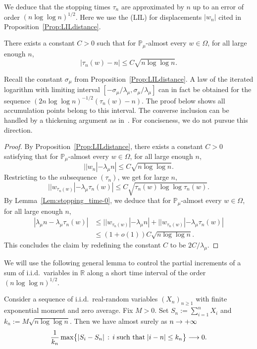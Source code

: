 \documentclass[AHL,Unicode,longabstracts,published]{cedram}
\newcommand{\R}{\mathbb{R}}
\renewcommand{\Pr}{\mathbb{P}}
\renewcommand{\(}{\left(}
\renewcommand{\)}{\right)}
\renewcommand*{\to}{\mathchoice{\longrightarrow}{\rightarrow}{\rightarrow}{\rightarrow}}
\begin{document}
We deduce that the stopping times $\tau_{n}$ are approximated by $n$ up to an error of order $(n\log\log n)^{1/2}$. Here we use the (LIL) for displacements $|w_{n}|$ cited in Proposition~\ref{Prop:LILdistance}.



\begin{lemm}\label{Lem:stopping_time}

There exists a constant $C> 0$ such that for $\Pr_{\mu}$-almost every $w\in \Omega$, for all large enough $n$,
\[
|\tau_n(w)-n|\le C\sqrt{n \log \log n}.
\]
\end{lemm}

\begin{rema}
Recall the constant $\sigma_{\mu}$ from Proposition~\ref{Prop:LILdistance}. A law of the iterated logarithm with limiting interval $[-\sigma_{\mu}/\lambda_{\mu}, \sigma_{\mu}/\lambda_{\mu}]$ can in fact be obtained for the sequence $(2n \log \log n)^{-1/2}(\tau_n(w)-n)$. The proof below shows all accumulation points belong to this interval. The converse inclusion can be handled by a thickening argument as in~\cite[Section~4.4]{BenardWinding}. For conciseness, we do not pursue this direction.
\end{rema}

\begin{proof}
By Proposition~\ref{Prop:LILdistance}, there exists a constant $C> 0$ satisfying that for $\Pr_{\mu}$-almost every $w\in \Omega$, for all large enough $n$,
\[
||w_n|-\lambda_\mu n| \le C\sqrt{n \log \log n}.
\]
Restricting to the subsequence $(\tau_{n})$, we get for large $n$,
\[
||w_{\tau_n(w)}|-\lambda_\mu \tau_n(w)|\le C\sqrt{\tau_n(w) \log \log \tau_n(w)}.
\]
By Lemma~\ref{Lem:stopping_time-0}, we deduce that for $\Pr_{\mu}$-almost every $w\in \Omega$, for all large enough $n$,
\begin{align*}
|\lambda_\mu n-\lambda_\mu \tau_n(w)| &\le ||w_{\tau_n(w)}|-\lambda_\mu n| +||w_{\tau_n(w)}|-\lambda_\mu \tau_n(w)|\\
&\le (1+o(1))C\sqrt{n\log \log n}.
\end{align*}
This concludes the claim by redefining the constant $C$ to be $2C/\lambda_\mu$.
\end{proof}

We will use the following general lemma to control the partial increments of a sum of i.i.d.\ variables in $\R$ along a short time interval of the order $(n\log\log n)^{1/2}$.


\begin{lemm}\label{Lem:LDP}
Consider a sequence of i.i.d.\ real-random variables $(X_n)_{n\ge 1}$ with finite exponential moment and zero average. Fix $M>0$. Set $S_n:=\sum_{i=1}^n X_i$ and $k_n:=M\sqrt{n\log \log n}$. Then we have almost surely as $n \to+ \infty$
\[
\frac{1}{k_n}\max\bigl\{ |S_i-S_n| \,:\, i \;\text{such that} \; |i-n| \le k_n\bigr\}\to 0.
\]
\end{lemm}
\end{document}
